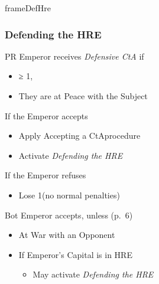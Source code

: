 \documentclass[10pt]{article}
\begin{document}
\begin{dynamiccontents*}{frameDefHre}
	\subsubsection*{Defending the HRE }
	\begin{itemize}
		\item PR Emperor receives \emph{Defensive CtA} if 
		\begin{itemize}
			\item \authority ≥ 1, 
			\item They are at Peace with the Subject
		\end{itemize}
		\item If the Emperor accepts
		\begin{itemize}
			\item Apply \dprime Accepting a CtA\dprime procedure
			\item {}Activate \emph{Defending the HRE}
		\end{itemize}
		\item If the Emperor refuses
		\begin{itemize}
			\item Lose 1\authority (no normal penalties)
		\end{itemize}
		{\botrules
		\item Bot Emperor accepts, unless (p.~6)
		\begin{itemize}
			\item At War with an Opponent
		\end{itemize}
		}
	\end{itemize}
	\begin{itemize}
		\item If Emperor's Capital is in HRE
		\begin{itemize}
			\item {}May activate \emph{Defending the HRE}
		\end{itemize}
	\end{itemize}
\end{dynamiccontents*}
\end{document}

